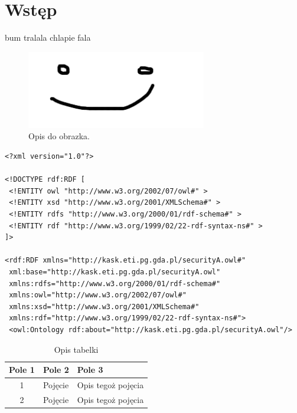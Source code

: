 \section{Wstęp}

bum tralala chlapie fala\cite{boinski2007kaskbook}

\begin{figure}
    \centering
    \includegraphics[width=0.7\textwidth]{images/obrazek.png}
    \caption{Opis do obrazka.}
    \label{fig:obrazek}
\end{figure}

\lstset{basicstyle=\scriptsize}
\begin{lstlisting}[frame=single,caption={Przykładowy listing},label=kod:listingA]
<?xml version="1.0"?>

<!DOCTYPE rdf:RDF [
 <!ENTITY owl "http://www.w3.org/2002/07/owl#" >
 <!ENTITY xsd "http://www.w3.org/2001/XMLSchema#" >
 <!ENTITY rdfs "http://www.w3.org/2000/01/rdf-schema#" >
 <!ENTITY rdf "http://www.w3.org/1999/02/22-rdf-syntax-ns#" >
]>

<rdf:RDF xmlns="http://kask.eti.pg.gda.pl/securityA.owl#"
 xml:base="http://kask.eti.pg.gda.pl/securityA.owl"
 xmlns:rdfs="http://www.w3.org/2000/01/rdf-schema#"
 xmlns:owl="http://www.w3.org/2002/07/owl#"
 xmlns:xsd="http://www.w3.org/2001/XMLSchema#"
 xmlns:rdf="http://www.w3.org/1999/02/22-rdf-syntax-ns#">
 <owl:Ontology rdf:about="http://kask.eti.pg.gda.pl/securityA.owl"/>

\end{lstlisting}

\begin{table}
    \caption{Opis tabelki}
    \label{tab:tab1}
     \centering
    \begin{tabular}{|c|p{4.5cm}|p{6cm}|}
      \hline
      Pole 1 & Pole 2 & Pole 3\\
      \hline
      1 & Pojęcie & Opis tegoż pojęcia\\
      \hline
      2 & Pojęcie & Opis tegoż pojęcia\\
      \hline
    \end{tabular}
\end{table}